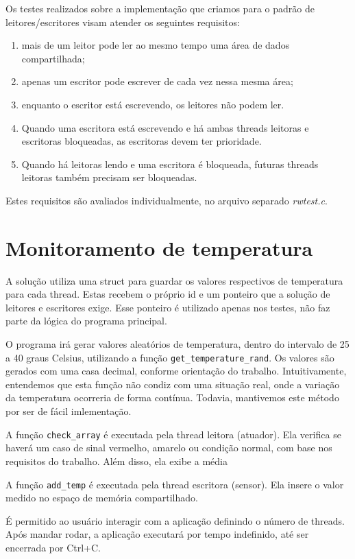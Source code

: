 \documentclass[12pt]{article}
\begin{document}
	Os testes realizados sobre a implementação que criamos
	para o padrão de leitores/escritores visam atender
	os seguintes requisitos:
	\begin{enumerate}
		\item mais de um leitor pode ler ao mesmo tempo
		uma área de dados compartilhada;
		\item apenas um escritor pode escrever
		de cada vez nessa mesma área;
		\item enquanto o escritor está escrevendo,
		os leitores não podem ler.
		\item Quando uma escritora está escrevendo e
		há ambas threads leitoras e escritoras bloqueadas,
		as escritoras devem ter prioridade.
		\item Quando há leitoras lendo e uma escritora
		é bloqueada, futuras threads leitoras
		também precisam ser bloqueadas.
	\end{enumerate}
	Estes requisitos são avaliados individualmente,
	no arquivo separado \textit{rwtest.c}.
	
	\section{Monitoramento de temperatura}
	
	A solução utiliza uma struct para guardar os valores
	respectivos de temperatura para cada thread. Estas
	recebem o próprio id e um ponteiro que a solução
	de leitores e escritores exige. Esse ponteiro é
	utilizado apenas nos testes, não faz parte da lógica
	do programa principal.
	
	O programa irá gerar valores aleatórios de temperatura,
	dentro do intervalo de 25 a 40 graus Celsius,
	utilizando a função \texttt{get\_temperature\_rand}.
	Os valores são gerados com uma casa decimal, conforme
	orientação do trabalho. Intuitivamente, entendemos que
	esta função não condiz com uma situação real,
	onde a variação da temperatura ocorreria de forma contínua.
	Todavia, mantivemos este método por ser de fácil imlementação.
	
	A função \texttt{check\_array} é executada pela thread leitora
	(atuador). Ela verifica se haverá
	um caso de sinal vermelho, amarelo ou condição normal,
	com base nos requisitos do trabalho. Além disso, ela
	exibe a média 
	
	A função \texttt{add\_temp} é executada pela thread escritora
	(sensor). Ela insere o valor medido no espaço
	de memória compartilhado.
	
	É permitido ao usuário interagir com a aplicação
	definindo o número de threads. Após mandar rodar,
	a aplicação executará por tempo indefinido, até ser encerrada
	por Ctrl+C.
	
\end{document}
